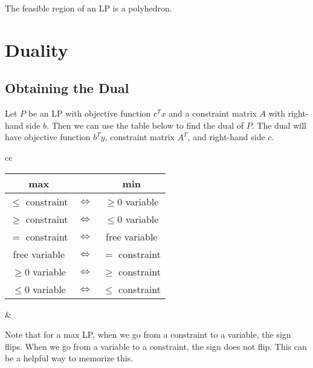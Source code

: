\documentclass[a4paper]{report}
\begin{document}
\begin{remark}
  The feasible region of an LP is a polyhedron.
\end{remark}

\chapter{Duality}

\section{Obtaining the Dual}
\begin{definition}[Dual of an LP]\label{dual}
  Let $P$ be an LP with objective function $c^Tx$ and a constraint matrix $A$ with right-hand side $b$. Then we can use the table below to find the dual of $P$. The dual will have objective function $b^T y$, constraint matrix $A^T$, and right-hand side $c$.
\end{definition}

\begin{note}
  \begin{tabular}{cc}
    \begin{minipage}{.5\linewidth}
    \begin{tabular}{|c|c|c|}
    \hline
    \textbf{max} & & \textbf{min} \\
    \hline
    $\leq$ constraint & $\iff$ & $\geq 0$ variable \\
    \hline  
    $\geq$ constraint & $\iff$ & $\leq 0$ variable \\ 
    \hline
    $=$ constraint & $\iff$ & free variable \\
    \hline
    \hline
    free variable & $\iff$ & $=$ constraint \\
    \hline
    $\geq 0$ variable & $\iff$ & $\geq$ constraint \\
    \hline   
    $\leq 0$ variable & $\iff$ & $\leq$ constraint \\
    \hline
  \end{tabular}
\end{minipage} &
\begin{minipage}{.5\linewidth}
  Note that for a max LP, when we go from a constraint to a variable, the sign flips. When we go from a variable to a constraint, the sign does not flip. This can be a helpful way to memorize this.
\end{minipage}%
\end{tabular}
\end{note}
\end{document}
